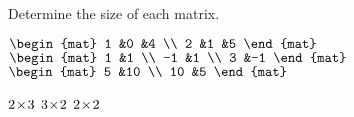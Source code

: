 
\begin{Exercise}[
name={},
title={}, 
difficulty=0,
origin={\cite{JH}}]
Determine the size of each matrix.
\begin{multicols}{3}
\Question \(
        \begin{mat}
          1  &0  &4  \\
          2  &1  &5
        \end{mat}  \) 
\Question \(
        \begin{mat}
          1  &1  \\
         -1  &1  \\
          3  &-1
        \end{mat}  \) 
\Question \(
        \begin{mat}
          5  &10 \\
         10  &5
        \end{mat}  \)
\EndCurrentQuestion
\end{multicols}

\end{Exercise}

\begin{Answer}
\Question \( 2 \! \times \! 3 \)
\Question \( 3 \! \times \! 2 \)
\Question \( 2 \! \times \! 2 \)
\end{Answer}
